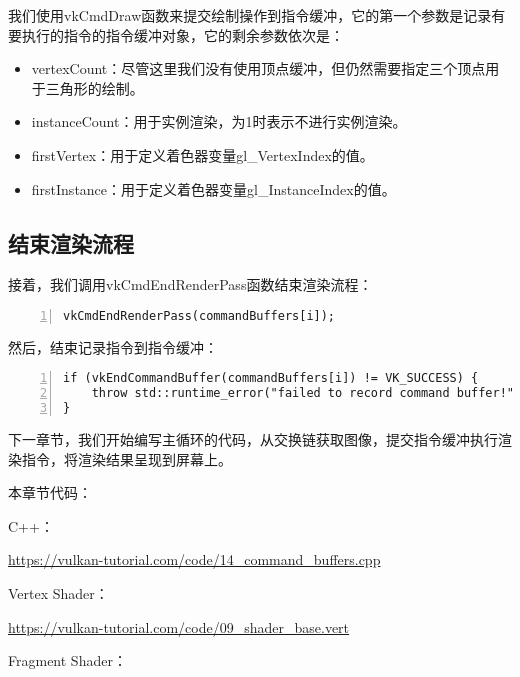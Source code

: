 \documentclass{ctexart}
\begin{document}
我们使用vkCmdDraw函数来提交绘制操作到指令缓冲，它的第一个参数是记录有要执行的指令的指令缓冲对象，它的剩余参数依次是：

\begin{itemize}
	\item vertexCount：尽管这里我们没有使用顶点缓冲，但仍然需要指定三个顶点用于三角形的绘制。
	\item instanceCount：用于实例渲染，为1时表示不进行实例渲染。
	\item firstVertex：用于定义着色器变量gl\_VertexIndex的值。
	\item firstInstance：用于定义着色器变量gl\_InstanceIndex的值。
\end{itemize}

\subsection{结束渲染流程}

接着，我们调用vkCmdEndRenderPass函数结束渲染流程：

\begin{lstlisting}[language={[ANSI]C},keywordstyle=\color{blue!70},commentstyle=\color{red!50!green!50!blue!50},frame=shadowbox, rulesepcolor=\color{red!20!green!20!blue!20},basicstyle=\small,numbers=left, numberstyle=\tiny,breaklines=true]
vkCmdEndRenderPass(commandBuffers[i]);
\end{lstlisting}

然后，结束记录指令到指令缓冲：

\begin{lstlisting}[language={[ANSI]C},keywordstyle=\color{blue!70},commentstyle=\color{red!50!green!50!blue!50},frame=shadowbox, rulesepcolor=\color{red!20!green!20!blue!20},basicstyle=\small,numbers=left, numberstyle=\tiny,breaklines=true]
if (vkEndCommandBuffer(commandBuffers[i]) != VK_SUCCESS) {
	throw std::runtime_error("failed to record command buffer!");
}
\end{lstlisting}

下一章节，我们开始编写主循环的代码，从交换链获取图像，提交指令缓冲执行渲染指令，将渲染结果呈现到屏幕上。

本章节代码：

C++：

\url{https://vulkan-tutorial.com/code/14_command_buffers.cpp}

Vertex Shader：

\url{https://vulkan-tutorial.com/code/09_shader_base.vert}

Fragment Shader：
\end{document}
